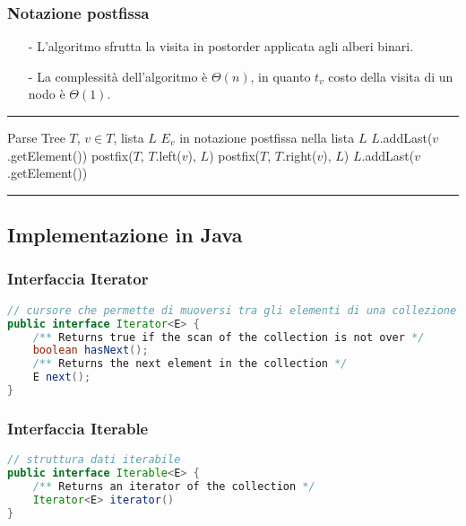 \documentclass[a4paper]{article}
\makeatletter
\newenvironment{algo}[4]{
	\noindent\rule{\textwidth}{0.4pt}
	\begin{algorithmic}[1]
		\addtocounter{ALG@line}{-1}
		\Procedure{#1}{#2}
		\Require #3
		\Ensure #4
		\Statex }{
		\EndProcedure
	\end{algorithmic}
	\rule{\textwidth}{0.4pt}}
\makeatother
\begin{document}
\subsubsection*{Notazione postfissa}
\begin{itemize}[topsep=3pt, itemsep=0pt]
	\item[-] L'algoritmo sfrutta la visita in postorder applicata agli alberi binari.
	\item[-] La complessità dell'algoritmo è \(\Theta\left(n\right)\), in quanto \(t_v\) costo della visita di un nodo è \(\Theta(1)\).
\end{itemize}
\begin{algo}{postfix}{$T$, $v$, $L$}{Parse Tree $T$, \(v \in T\), lista $L$}{$E_v$ in notazione postfissa nella lista $L$}
		\State $L$.addLast($v$.getElement())
	\Else
		\State postfix($T$, $T$.left($v$), $L$)
		\State postfix($T$, $T$.right($v$), $L$)
		\State $L$.addLast($v$.getElement())
	\EndIf
\end{algo}

\newpage

\subsection{Implementazione in Java}
\subsubsection*{Interfaccia Iterator}
\begin{lstlisting}[language=Java]
// cursore che permette di muoversi tra gli elementi di una collezione
public interface Iterator<E> {
	/** Returns true if the scan of the collection is not over */
	boolean hasNext();
	/** Returns the next element in the collection */
	E next();
}
\end{lstlisting}

\subsubsection*{Interfaccia Iterable}
\begin{lstlisting}[language=Java]
// struttura dati iterabile
public interface Iterable<E> {
	/** Returns an iterator of the collection */
	Iterator<E> iterator()
}
\end{lstlisting}
\end{document}

